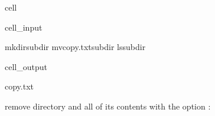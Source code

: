\documentclass[a4paper,10pt,english]{jupyterBook}
\begin{document}
\begin{sphinxuseclass}{cell}\begin{sphinxVerbatimInput}

\begin{sphinxuseclass}{cell_input}
\begin{sphinxVerbatim}[commandchars=\\\{\}]
mkdirsubdir
mvcopy.txtsubdir
lssubdir
\end{sphinxVerbatim}

\end{sphinxuseclass}\end{sphinxVerbatimInput}
\begin{sphinxVerbatimOutput}

\begin{sphinxuseclass}{cell_output}
\begin{sphinxVerbatim}[commandchars=\\\{\}]
copy.txt
\end{sphinxVerbatim}

\end{sphinxuseclass}\end{sphinxVerbatimOutput}

\end{sphinxuseclass}
\sphinxAtStartPar
{} remove directory and all of its contents with the  option :
\end{document}
